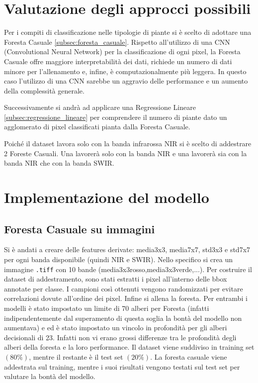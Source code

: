 \section{Valutazione degli approcci possibili}

Per i compiti di classificazione nelle tipologie di piante si è scelto di adottare una Foresta Casuale \ref{subsec:foresta_casuale}.  
Rispetto all'utilizzo di una CNN (Convolutional Neural Network) per la classificazione di ogni pixel, la Foresta Casuale 
offre maggiore interpretabilità dei dati, richiede un numero di dati minore per l'allenamento e, infine, 
è computazionalmente più leggera. In questo caso l'utilizzo di una CNN sarebbe un aggravio delle performance e 
un aumento della complessità generale.


Successivamente si andrà ad applicare una Regressione Lineare 
\ref{subsec:regressione_lineare} per comprendere il numero di piante dato un 
agglomerato di pixel classificati pianta dalla Foresta Casuale. 

Poiché il dataset \cite{guillem_montalban_faet_2025_17866344} lavora solo con la banda infrarossa NIR si è scelto di addestrare 2 Foreste Casuali. 
Una lavorerà solo con la banda NIR e una lavorerà sia con la banda NIR che con la banda SWIR.

\section{Implementazione del modello}
\subsection{Foresta Casuale su immagini}
Si è andati a creare delle features derivate: media3x3, media7x7, std3x3 e std7x7 per ogni banda disponibile (quindi NIR e SWIR). Nello specifico si crea un immagine \texttt{.tiff} con 10 bande (media3x3rosso,media3x3verde,...).
Per costruire il dataset di addestramento, sono stati estratti i pixel all'interno delle bbox annotate per classe. I campioni così ottenuti vengono randomizzati per evitare correlazioni dovute all'ordine dei pixel.
Infine si allena la foresta.
Per entrambi i modelli è stato impostato un limite
di 70 alberi per Foresta (infatti indipendentemente dal superamento di questa soglia la bontà del modello non aumentava) e ed è stato impostato un vincolo 
in profondità per gli alberi decisionali di 23. Infatti non vi erano grossi differenze tra le profondità degli alberi della foresta e la loro performance.
Il dataset viene suddiviso in training set $(80\%)$, mentre
il restante è il test set $(20\%)$. La foresta casuale viene addestrata sul training, 
mentre i suoi risultati vengono testati sul test set per valutare la bontà del modello.




